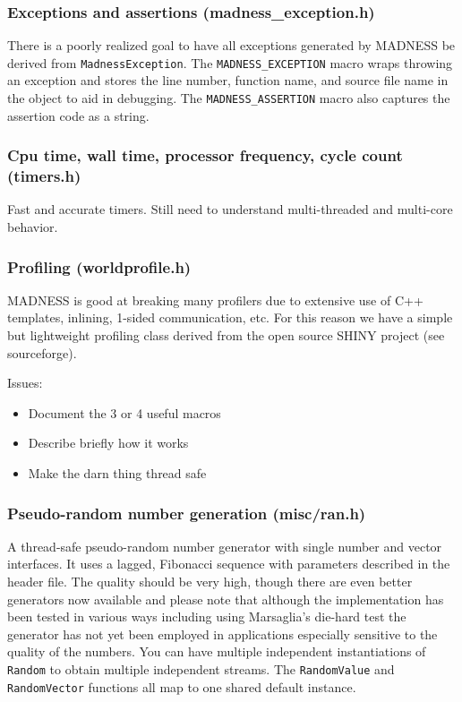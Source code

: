 \documentclass[letterpaper]{article}
\newcommand\liststyleLii{%
\renewcommand\labelitemi{${\bullet}$}
\renewcommand\labelitemii{${\circ}$}
\renewcommand\labelitemiii{${\blacksquare}$}
\renewcommand\labelitemiv{${\bullet}$}
}
\begin{document}
\subsubsection{Exceptions and assertions (madness\_exception.h)}
There is a poorly realized goal to have all exceptions generated by MADNESS be derived from \texttt{MadnessException}.
The \texttt{MADNESS\_EXCEPTION} macro wraps throwing an exception and stores the line number, function name, and source
file name in the object to aid in debugging. The \texttt{MADNESS\_ASSERTION} macro also captures the assertion code as
a string.

\subsubsection{Cpu time, wall time, processor frequency, cycle count (timers.h)}
Fast and accurate timers. Still need to understand multi-threaded and multi-core behavior.

\subsubsection{Profiling (worldprofile.h)}
MADNESS is good at breaking many profilers due to extensive use of C++ templates, inlining, 1-sided communication, etc.
For this reason we have a simple but lightweight profiling class derived from the open source SHINY project (see
sourceforge).

Issues:

\liststyleLii
\begin{itemize}
\item Document the 3 or 4 useful macros
\item Describe briefly how it works
\item Make the darn thing thread safe
\end{itemize}
\subsubsection{Pseudo-random number generation (misc/ran.h)}
A thread-safe pseudo-random number generator with single number and vector interfaces. It uses a lagged, Fibonacci
sequence with parameters described in the header file. The quality should be very high, though there are even better
generators now available and please note that although the implementation has been tested in various ways including
using Marsaglia's die-hard test the generator has not yet been employed in applications especially sensitive to the
quality of the numbers. You can have multiple independent instantiations of \texttt{Random} to obtain multiple
independent streams. The \texttt{RandomValue} and \texttt{RandomVector} functions all map to one shared default
instance.
\end{document}
